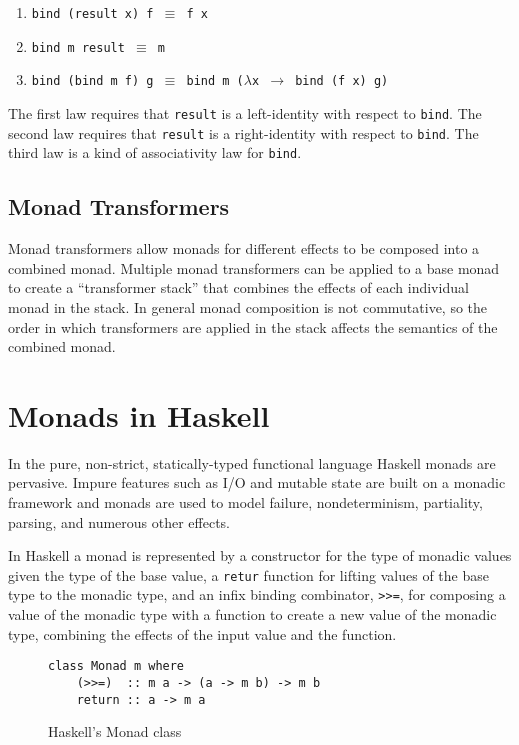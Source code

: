 \documentclass[preprint,natbib,10pt]{sigplanconf}
\begin{document}
\begin{enumerate}
\item {\tt bind (result x) f $\equiv$ f x}
\item {\tt bind m result $\equiv$ m}
\item {\tt bind (bind m f) g $\equiv$ bind m ($\lambda$x $\rightarrow$ bind (f x) g)}
\end{enumerate}

The first law requires that {\tt result} is a left-identity with
respect to {\tt bind}. The second law requires that {\tt result} is a
right-identity with respect to {\tt bind}. The third law is a kind of
associativity law for {\tt bind}.

\subsection{Monad Transformers}

Monad transformers allow monads for different effects to be composed
into a combined monad.  Multiple monad transformers can be applied to
a base monad to create a ``transformer stack'' that combines the
effects of each individual monad in the stack.  In general monad
composition is not commutative, so the order in which transformers are
applied in the stack affects the semantics of the combined monad.

\section{Monads in Haskell}

In the pure, non-strict, statically-typed functional language Haskell
monads are pervasive.  Impure features such as I/O and mutable state
are built on a monadic framework and monads are used to model failure,
nondeterminism, partiality, parsing, and numerous other effects.

In Haskell a monad is represented by a constructor for the type of
monadic values given the type of the base value, a {\tt retur}
function for lifting values of the base type to the monadic type, and
an infix binding combinator, {\tt >>=}, for composing a value of the
monadic type with a function to create a new value of the monadic
type, combining the effects of the input value and the function.

\begin{figure}
\begin{center}
\begin{verbatim}
class Monad m where
    (>>=)  :: m a -> (a -> m b) -> m b
    return :: a -> m a
\end{verbatim}
\end{center}
\caption{Haskell's Monad class}
\label{fig-Haskell-Monad-class}
\end{figure}
\end{document}
